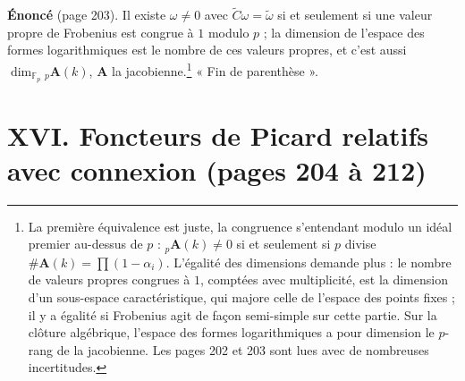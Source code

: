 \documentclass[11pt,a4paper]{article}
\begin{document}
\textbf{Énoncé} (page 203). Il existe $\omega \neq 0$ avec $\widetilde C\omega =
\tilde\omega$ si et seulement si une valeur propre de Frobenius est congrue à
$1$ modulo $p$ ; la dimension de l'espace des formes logarithmiques est le
nombre de ces valeurs propres, et c'est aussi $\dim_{\mathbb{F}_p}
{}_p\mathbf{A}(k)$, $\mathbf{A}$ la jacobienne.\footnote{La première
équivalence est juste, la congruence s'entendant modulo un idéal premier
au-dessus de $p$ : ${}_p\mathbf{A}(k) \neq 0$ si et seulement si $p$ divise
$\#\mathbf{A}(k) = \prod(1 - \alpha_i)$. L'égalité des dimensions demande plus :
le nombre de valeurs propres congrues à $1$, comptées avec multiplicité, est
la dimension d'un sous-espace caractéristique, qui majore celle de l'espace
des points fixes ; il y a égalité si Frobenius agit de façon semi-simple sur
cette partie. Sur la clôture algébrique, l'espace des formes logarithmiques
a pour dimension le $p$-rang de la jacobienne. Les pages 202 et 203 sont
lues avec de nombreuses incertitudes.} « Fin de parenthèse ».

\section*{XVI. Foncteurs de Picard relatifs avec connexion (pages 204 à 212)}
\end{document}
